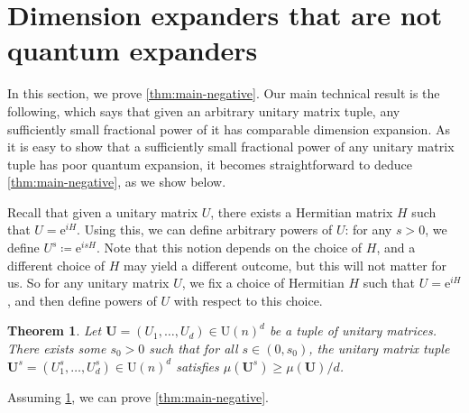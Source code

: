 \documentclass[11pt]{article}
\newtheorem{theorem}{Theorem}[section]
\newcommand{\eee}{\mathrm e}
\theoremstyle{plain}
\numberwithin{equation}{section}
\theoremstyle{definition}
\newcommand{\tuple}[1]{\mathbf{#1}}
\newcommand{\vU}{\tuple{U}}
\begin{document}
%

\section{Dimension expanders that are not quantum expanders}\label{sec:dim-not-quantum}
In this section, we prove \cref{thm:main-negative}. Our main technical result is the following, which says that given an arbitrary unitary matrix tuple, any sufficiently small fractional power of it has comparable dimension expansion. As it is easy to show that a sufficiently small fractional power of any unitary matrix tuple has poor quantum expansion, it becomes straightforward to deduce \cref{thm:main-negative}, as we show below.

Recall that given a unitary matrix $U$, there exists a Hermitian matrix $H$ such that 
$U = \eee^{iH}$. Using this, we can define arbitrary powers of $U$: for any $s>0$, we define $U^s \coloneqq \eee^{isH}$. Note that this notion depends on the choice of $H$, and a different choice of $H$ may yield a different outcome, but this will not matter for us. So for any unitary matrix $U$, we fix a choice of Hermitian $H$ such that $U=\eee^{iH}$, and then define powers of $U$ with respect to this choice.
\begin{theorem}\label{thm:exp-keeps-dim-exp}
    Let $\vU=(U_1,\dots,U_d)\in \mathrm{U}(n)^d$ be a tuple of unitary matrices. There exists some $s_0>0$ such that for all $s \in (0,s_0)$, the unitary matrix tuple $\vU^s=(U_1^s,\dots,U_d^s)\in\mathrm{U}(n)^d$ satisfies $\mu(\vU^s) \geq \mu(\vU)/d$.
\end{theorem}

Assuming \cref{thm:exp-keeps-dim-exp}, we can prove \cref{thm:main-negative}.
\end{document}
